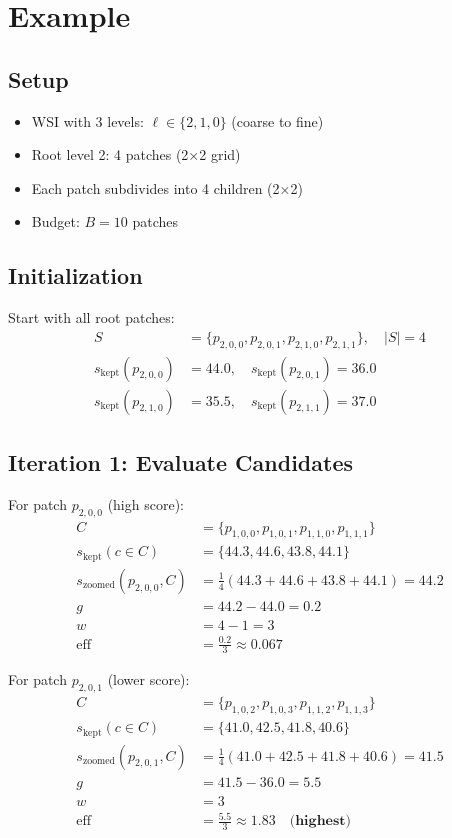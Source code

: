 \documentclass[11pt]{article}
\begin{document}
\section{Example}

\subsection{Setup}
\begin{itemize}[nosep]
    \item WSI with 3 levels: $\ell \in \{2, 1, 0\}$ (coarse to fine)
    \item Root level 2: 4 patches (2×2 grid)
    \item Each patch subdivides into 4 children (2×2)
    \item Budget: $B = 10$ patches
\end{itemize}

\subsection{Initialization}
Start with all root patches:
\begin{align*}
S &= \{p_{2,0,0}, p_{2,0,1}, p_{2,1,0}, p_{2,1,1}\}, \quad |S| = 4 \\
s_{\text{kept}}(p_{2,0,0}) &= 44.0, \quad s_{\text{kept}}(p_{2,0,1}) = 36.0 \\
s_{\text{kept}}(p_{2,1,0}) &= 35.5, \quad s_{\text{kept}}(p_{2,1,1}) = 37.0
\end{align*}

\subsection{Iteration 1: Evaluate Candidates}

For patch $p_{2,0,0}$ (high score):
\begin{align*}
C &= \{p_{1,0,0}, p_{1,0,1}, p_{1,1,0}, p_{1,1,1}\} \\
s_{\text{kept}}(c\in C) &= \{44.3, 44.6, 43.8, 44.1\} \\
s_{\text{zoomed}}(p_{2,0,0}, C) &= \frac{1}{4}(44.3 + 44.6 + 43.8 + 44.1) = 44.2 \\
g &= 44.2 - 44.0 = 0.2 \\
w &= 4 - 1 = 3 \\
\text{eff} &= \frac{0.2}{3} \approx 0.067
\end{align*}

For patch $p_{2,0,1}$ (lower score):
\begin{align*}
C &= \{p_{1,0,2}, p_{1,0,3}, p_{1,1,2}, p_{1,1,3}\} \\
s_{\text{kept}}(c\in C) &= \{41.0, 42.5, 41.8, 40.6\} \\
s_{\text{zoomed}}(p_{2,0,1}, C) &= \frac{1}{4}(41.0 + 42.5 + 41.8 + 40.6) = 41.5 \\
g &= 41.5 - 36.0 = 5.5 \\
w &= 3 \\
\text{eff} &= \frac{5.5}{3} \approx 1.83 \quad \textbf{(highest)}
\end{align*}
\end{document}
